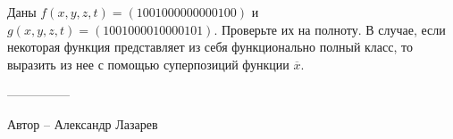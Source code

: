 \question
Даны $f(x, y, z, t) = (1001000000000100)$ и $g(x, y, z, t) = (1001000010000101)$. Проверьте их на полноту. В случае, если некоторая функция представляет из себя функционально полный класс, то выразить из нее с помощью суперпозиций функции $\overline{x}$.

---------------

Автор -- Александр Лазарев